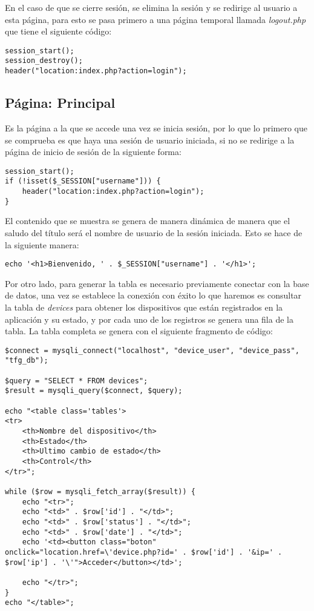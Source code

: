 En el caso de que se cierre sesión, se elimina la sesión y se redirige al usuario a esta página, para esto se pasa primero a una página temporal llamada \textit{logout.php} que tiene el siguiente código:
\begin{lstlisting}
session_start();
session_destroy();
header("location:index.php?action=login");
\end{lstlisting}

\subsection{Página: Principal}\label{subsec:implPagPrincipal}
Es la página a la que se accede una vez se inicia sesión, por lo que lo primero que se comprueba es que haya una sesión de usuario iniciada, si no se redirige a la página de inicio de sesión de la siguiente forma:
\begin{lstlisting}
session_start();
if (!isset($_SESSION["username"])) {
    header("location:index.php?action=login");
}
\end{lstlisting}

El contenido que se muestra se genera de manera dinámica de manera que el saludo del título será el nombre de usuario de la sesión iniciada. Esto se hace de la siguiente manera:
\begin{lstlisting}
echo '<h1>Bienvenido, ' . $_SESSION["username"] . '</h1>';
\end{lstlisting}

Por otro lado, para generar la tabla es necesario previamente conectar con la base de datos, una vez se establece la conexión con éxito lo que haremos es consultar la tabla de \textit{devices} para obtener los dispositivos que están registrados en la aplicación y su estado, y por cada uno de los registros se genera una fila de la tabla. La tabla completa se genera con el siguiente fragmento de código:
\begin{lstlisting}
$connect = mysqli_connect("localhost", "device_user", "device_pass", "tfg_db");

$query = "SELECT * FROM devices";
$result = mysqli_query($connect, $query);

echo "<table class='tables'>
<tr>
    <th>Nombre del dispositivo</th>
    <th>Estado</th>
    <th>Ultimo cambio de estado</th>
    <th>Control</th>
</tr>";

while ($row = mysqli_fetch_array($result)) {
    echo "<tr>";
    echo "<td>" . $row['id'] . "</td>";
    echo "<td>" . $row['status'] . "</td>";
    echo "<td>" . $row['date'] . "</td>";
    echo '<td><button class="boton" onclick="location.href=\'device.php?id=' . $row['id'] . '&ip=' . $row['ip'] . '\'">Acceder</button></td>';

    echo "</tr>";
}
echo "</table>";
\end{lstlisting}

